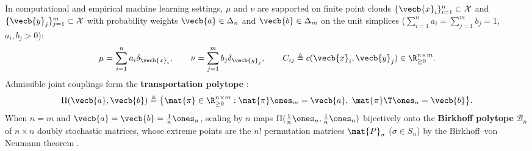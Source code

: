 \documentclass[../../../../master.tex]{subfiles}
\begin{document}
In computational and empirical machine learning settings, $\mu$ and $\nu$ are supported on finite point clouds $\{\vecb{x}_i\}_{i=1}^n \subset \mathcal{X}$ and $\{\vecb{y}_j\}_{j=1}^m \subset \mathcal{X}$ with probability weights $\vecb{a} \in \Delta_n$ and $\vecb{b} \in \Delta_m$ on the unit simplices ($\sum_{i=1}^n a_i = \sum_{j=1}^m b_j = 1$, $a_i, b_j > 0$):
\begin{equation}
\label{eq:ot:discrete_measures}
  \mu = \sum_{i=1}^n a_i \delta_{\vecb{x}_i}, \qquad
  \nu = \sum_{j=1}^m b_j \delta_{\vecb{y}_j}, \qquad
  C_{ij} \triangleq c(\vecb{x}_i, \vecb{y}_j) \in \R_{\ge 0}^{n \times m}.
\end{equation}
Admissible joint couplings form the \textbf{transportation polytope}  :
\begin{equation}
\label{eq:ot:polytope}
  \Pi(\vecb{a}, \vecb{b}) \triangleq \bigl\{ \mat{\pi} \in \R_{\ge 0}^{n \times m} : \mat{\pi}\ones_m = \vecb{a},\; \mat{\pi}\T\ones_n = \vecb{b} \bigr\}.
\end{equation}
When $n = m$ and $\vecb{a} = \vecb{b} = \frac{1}{n}\ones_n$, scaling by $n$ maps $\Pi(\frac{1}{n}\ones_n, \frac{1}{n}\ones_n)$ bijectively onto the \textbf{Birkhoff polytope} $\mathcal{B}_n$ of $n \times n$ doubly stochastic matrices, whose extreme points are the $n!$ permutation matrices $\mat{P}_\sigma$ ($\sigma \in S_n$) by the Birkhoff--von Neumann theorem .
\end{document}
